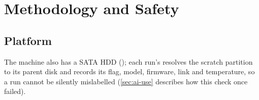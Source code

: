 \section{Methodology and Safety}\label{sec:method}

\subsection{Platform}
\newcommand{\acspinning}{a single I/O-issuing thread, not CPU-pinned (storage I/O is device-bound, not
CPU-bound, below the host-saturation queue depths of \cref{sec:queue-depth})}
\newcommand{\acsenvextra}{%
  SSD       & Micron 2210 \code{MTFDHBA512QFD}, \qty{512}{\giga\byte} QLC NVMe \cite{micron2210brief},
              firmware \code{P6MA001} (SMART log taken with root after the run, \cref{sec:anomalies}) \\
  Interface & PCIe \qty{8.0}{GT/s} $\times$4 (Gen3), current and maximum, from sysfs. Raw ceiling
              $8\,\text{GT/s}\times4\times\tfrac{128}{130}=\qty{3.94}{\giga\byte\per\second}$
              (\qty{3756}{\mebi\byte\per\second}; 128b/130b coding \cite{pcisig_pcie3}), roughly
              \qtyrange{3.2}{3.5}{\giga\byte\per\second} after TLP/DLLP overhead \\
  Block layer & scheduler \code{none}, \code{nr_requests} 1023, 16 I/O queues, volatile write cache
              \enquote{write back} \\
  Target    & disposable files on the SSD's ext4 \code{/} partition (\code{nvme0n1p3}, \code{relatime},
              no online discard) via \code{ACS_SCRATCH}: a \qty{2}{\gibi\byte} test file for the sweeps
              and a \qty{60}{\gibi\byte} file for the device-state runs \\
  Temperature & NVMe composite sensor (\code{hwmon*/temp1_input}), logged per repetition and every
              second in the sustained runs \\
}


The machine also has a SATA HDD (); each run's  resolves the scratch
partition to its parent disk and records its  flag, model, firmware, link and
temperature, so a run cannot be silently mislabelled (\cref{sec:ai-use} describes how this check once
failed).

